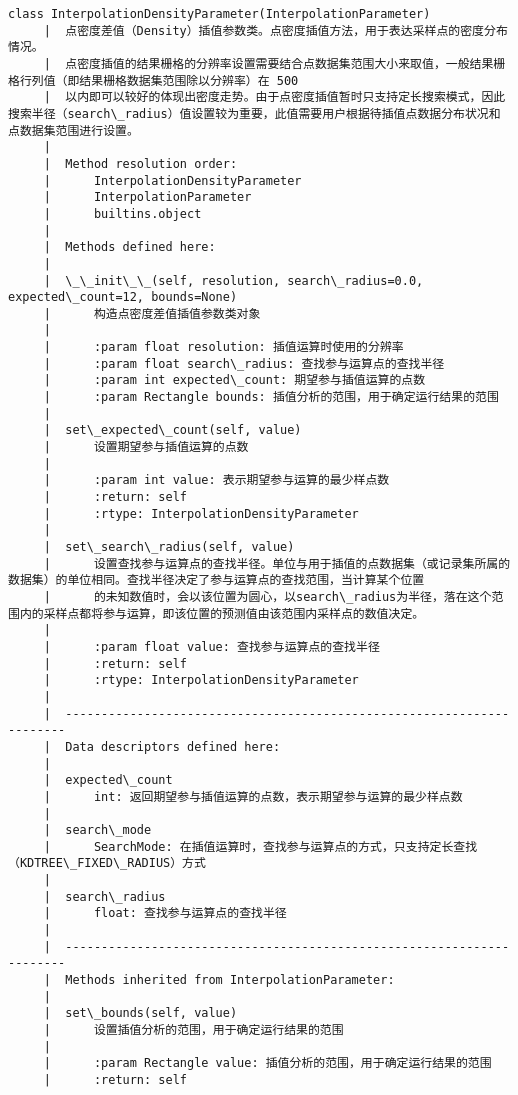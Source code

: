 \documentclass[11pt]{article}
\begin{document}
\begin{Verbatim}[commandchars=\\\{\}]
    class InterpolationDensityParameter(InterpolationParameter)
     |  点密度差值（Density）插值参数类。点密度插值方法，用于表达采样点的密度分布情况。
     |  点密度插值的结果栅格的分辨率设置需要结合点数据集范围大小来取值，一般结果栅格行列值（即结果栅格数据集范围除以分辨率）在 500
     |  以内即可以较好的体现出密度走势。由于点密度插值暂时只支持定长搜索模式，因此搜索半径（search\_radius）值设置较为重要，此值需要用户根据待插值点数据分布状况和点数据集范围进行设置。
     |  
     |  Method resolution order:
     |      InterpolationDensityParameter
     |      InterpolationParameter
     |      builtins.object
     |  
     |  Methods defined here:
     |  
     |  \_\_init\_\_(self, resolution, search\_radius=0.0, expected\_count=12, bounds=None)
     |      构造点密度差值插值参数类对象
     |      
     |      :param float resolution: 插值运算时使用的分辨率
     |      :param float search\_radius: 查找参与运算点的查找半径
     |      :param int expected\_count: 期望参与插值运算的点数
     |      :param Rectangle bounds: 插值分析的范围，用于确定运行结果的范围
     |  
     |  set\_expected\_count(self, value)
     |      设置期望参与插值运算的点数
     |      
     |      :param int value: 表示期望参与运算的最少样点数
     |      :return: self
     |      :rtype: InterpolationDensityParameter
     |  
     |  set\_search\_radius(self, value)
     |      设置查找参与运算点的查找半径。单位与用于插值的点数据集（或记录集所属的数据集）的单位相同。查找半径决定了参与运算点的查找范围，当计算某个位置
     |      的未知数值时，会以该位置为圆心，以search\_radius为半径，落在这个范围内的采样点都将参与运算，即该位置的预测值由该范围内采样点的数值决定。
     |      
     |      :param float value: 查找参与运算点的查找半径
     |      :return: self
     |      :rtype: InterpolationDensityParameter
     |  
     |  ----------------------------------------------------------------------
     |  Data descriptors defined here:
     |  
     |  expected\_count
     |      int: 返回期望参与插值运算的点数，表示期望参与运算的最少样点数
     |  
     |  search\_mode
     |      SearchMode: 在插值运算时，查找参与运算点的方式，只支持定长查找（KDTREE\_FIXED\_RADIUS）方式
     |  
     |  search\_radius
     |      float: 查找参与运算点的查找半径
     |  
     |  ----------------------------------------------------------------------
     |  Methods inherited from InterpolationParameter:
     |  
     |  set\_bounds(self, value)
     |      设置插值分析的范围，用于确定运行结果的范围
     |      
     |      :param Rectangle value: 插值分析的范围，用于确定运行结果的范围
     |      :return: self

\end{Verbatim}
\end{document}
